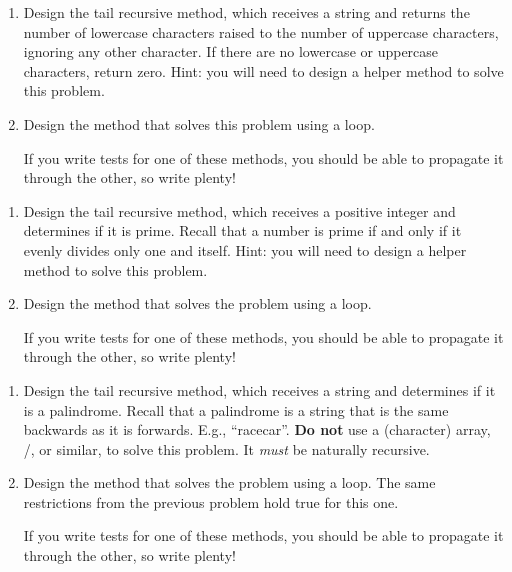 \begin{enumerate}[label=(\alph*)]
    \item Design the  tail recursive method, which receives a string and returns the number of lowercase characters raised to the number of uppercase characters, ignoring any other character. If there are no lowercase or uppercase characters, return zero. Hint: you will need to design a  helper method to solve this problem.
    \item Design the  method that solves this problem using a loop.

    If you write tests for one of these methods, you should be able to propagate it through the other, so write plenty!
\end{enumerate}

\begin{enumerate}[label=(\alph*)]
    \item Design the  tail recursive method, which receives a positive integer and determines if it is prime. Recall that a number is prime if and only if it evenly divides only one and itself. Hint: you will need to design a  helper method to solve this problem.
    \item Design the  method that solves the problem using a loop.

    If you write tests for one of these methods, you should be able to propagate it through the other, so write plenty!
\end{enumerate}

\begin{enumerate}[label=(\alph*)]
    \item Design the  tail recursive method, which receives a string and determines if it is a palindrome. Recall that a palindrome is a string that is the same backwards as it is forwards. E.g., ``racecar''. \textbf{Do not} use a (character) array, /, or similar, to solve this problem. It \textit{must} be naturally recursive.
    \item Design the  method that solves the problem using a loop. The same restrictions from the previous problem hold true for this one.

    If you write tests for one of these methods, you should be able to propagate it through the other, so write plenty!
\end{enumerate}

